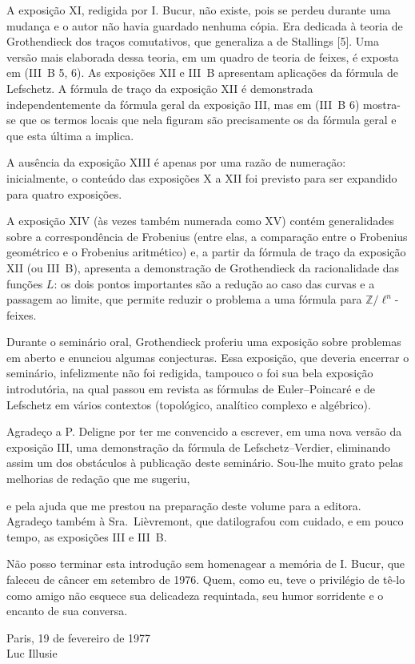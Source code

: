 \clearpage

A exposição XI, redigida por I. Bucur, não existe, pois se perdeu durante uma mudança e o autor não havia guardado nenhuma cópia. Era dedicada à teoria de Grothendieck dos traços comutativos, que generaliza a de Stallings [5]. Uma versão mais elaborada dessa teoria, em um quadro de teoria de feixes, é exposta em (III~B 5, 6). As exposições XII e III~B apresentam aplicações da fórmula de Lefschetz. A fórmula de traço da exposição XII é demonstrada independentemente da fórmula geral da exposição III, mas em (III~B 6) mostra-se que os termos locais que nela figuram são precisamente os da fórmula geral e que esta última a implica.

A ausência da exposição XIII é apenas por uma razão de numeração: inicialmente, o conteúdo das exposições X a XII foi previsto para ser expandido para quatro exposições.

A exposição XIV (às vezes também numerada como XV) contém generalidades sobre a correspondência de Frobenius (entre elas, a comparação entre o Frobenius geométrico e o Frobenius aritmético) e, a partir da fórmula de traço da exposição XII (ou III~B), apresenta a demonstração de Grothendieck da racionalidade das funções $L$: os dois pontos importantes são a redução ao caso das curvas e a passagem ao limite, que permite reduzir o problema a uma fórmula para $\mathbb Z/\ell^n$-feixes.

Durante o seminário oral, Grothendieck proferiu uma exposição sobre problemas em aberto e enunciou algumas conjecturas. Essa exposição, que deveria encerrar o seminário, infelizmente não foi redigida, tampouco o foi sua bela exposição introdutória, na qual passou em revista as fórmulas de Euler--Poincaré e de Lefschetz em vários contextos (topológico, analítico complexo e algébrico).

Agradeço a P. Deligne por ter me convencido a escrever, em uma nova versão da exposição III, uma demonstração da fórmula de Lefschetz--Verdier, eliminando assim um dos obstáculos à publicação deste seminário. Sou-lhe muito grato pelas melhorias de redação que me sugeriu,

\clearpage
\noindent e pela ajuda que me prestou na preparação deste volume para a editora. Agradeço também à Sra.~Lièvremont, que datilografou com cuidado, e em pouco tempo, as exposições III e III~B.

Não posso terminar esta introdução sem homenagear a memória de I. Bucur, que faleceu de câncer em setembro de 1976. Quem, como eu, teve o privilégio de tê-lo como amigo não esquece sua delicadeza requintada, seu humor sorridente e o encanto de sua conversa.

\begin{flushright}
Paris, 19 de fevereiro de 1977\\[1.2em]
Luc Illusie
\end{flushright}

